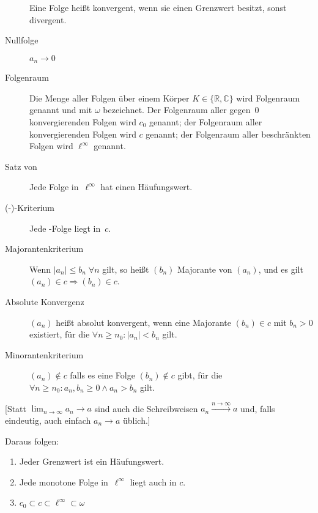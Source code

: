 \begin{description}
        Eine Folge heißt konvergent, wenn sie einen Grenzwert besitzt, sonst divergent.
  \item [Nullfolge] 
        $a_n \to 0$
  \item[Folgenraum] 
        Die Menge aller Folgen über einem Körper $K \in \{\mathbb{R}, \mathbb{C}\}$ wird Folgenraum genannt und mit $\omega$ bezeichnet.
        Der Folgenraum aller gegen~$0$ konvergierenden Folgen wird $c_0$ genannt; der Folgenraum aller konvergierenden Folgen wird $c$ genannt; der Folgenraum aller beschränkten Folgen wird $\ell^\infty$ genannt.
  \item [Satz von \noun{Bolzano-Weierstraß}] 
        Jede Folge in~$\ell^\infty$ hat einen Häufungswert.
  \item [(\noun{Bolzano}-)\noun{Cauchy}-Kriterium] 
        Jede -Folge liegt in~$c$.
  \item[Majorantenkriterium] 
        Wenn $\lvert a_n \rvert \leq b_n\; \forall n$ gilt, so heißt $(b_n)$ Majorante von $(a_n)$, und  es gilt $(a_n) \in c \Rightarrow (b_n) \in c$.
  \item [Absolute Konvergenz]
        $(a_n)$ heißt absolut konvergent, wenn eine Majorante $(b_n) \in c$ mit $b_n>0$ existiert, für die $\forall n\geq n_0 : \lvert a_n \rvert < b_n$ gilt.
  \item [Minorantenkriterium] 
        $(a_n) \notin c$ falls es eine Folge $(b_n) \notin c$ gibt, für die $\forall n\geq n_0 : a_n, b_n \geq 0 \land a_n  > b_n$ gilt.
\end{description}

[Statt $\lim_{n \to \infty} a_n \to a$ sind auch die Schreibweisen $a_n \xrightarrow{n\to\infty} a$ und, falls eindeutig, auch einfach $a_n \to a$ üblich.]

Daraus folgen:
\begin{enumerate}
    \item Jeder Grenzwert ist ein Häufungswert.
    \item Jede monotone Folge in~$\ell^\infty$ liegt auch in $c$.
    \item $c_0 \subset c \subset \ell^\infty \subset \omega$
\end{enumerate}

